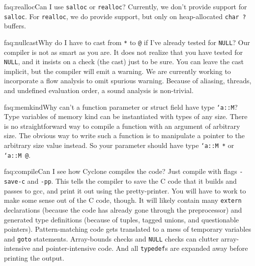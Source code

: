 \begin{faqa}{faq:realloc}{Can I use \texttt{salloc} or \texttt{realloc}?}
Currently, we don't provide support for \texttt{salloc}.  For 
\texttt{realloc}, we do provide support, but only on heap-allocated
\texttt{char ?} buffers.
\end{faqa}

\begin{faqa}{faq:nullcast}{Why do I have to cast from \texttt{*} to \texttt{@} if I've already tested for \texttt{NULL}?} 
Our compiler is not as smart as you are.  It does not realize that you
have tested for \texttt{NULL}, and it insists on a check (the cast)
just to be sure.  You can leave the cast implicit, but the compiler
will emit a warning.  We are currently working to incorporate a flow
analysis to omit spurious warning.  Because of aliasing, threads, and 
undefined evaluation order, a sound analysis is non-trivial.
\end{faqa}

\begin{faqa}{faq:memkind}{Why can't a function parameter or struct field have type \texttt{`a::M}?} 
Type variables of memory kind can be instantiated with types of any
size.  There is no straightforward way to compile a function with an
argument of arbitrary size.  The obvious way to write such a function
is to manipulate a pointer to the arbitrary size value instead.  So
your parameter should have type \texttt{`a::M *} or \texttt{`a::M @}.
\end{faqa}

\begin{faqa}{faq:compile}{Can I see how Cyclone compiles the code?}
Just compile with flags \texttt{-save-c} and \texttt{-pp}.  This tells
the compiler to save the C code that it builds and passes to gcc, and
print it out using the pretty-printer.  You will have to work to make
some sense out of the C code, though.  It will likely contain many
\texttt{extern} declarations (because the code has already gone
through the preprocessor) and generated type definitions (because of
tuples, tagged unions, and questionable pointers).  Pattern-matching
code gets translated to a mess of temporary variables and
\texttt{goto} statements.  Array-bounds checks and \texttt{NULL}
checks can clutter array-intensive and pointer-intensive code.  And
all \texttt{typedef}s are expanded away before printing the output.
\end{faqa}

